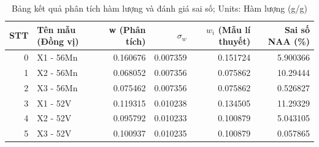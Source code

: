 \begin{table}[htbp]
    \centering
    \caption{Bảng kết quả phân tích hàm lượng và đánh giá sai số; Units: Hàm lượng (g/g)}
      \begin{tabular}{rlrrrr}
    STT & Tên mẫu (Đồng vị) & w (Phân tích) & $\sigma_w$ & $w_{i}$ (Mẫu lí thuyết) & Sai số NAA (\%) \\
    \hline    
    0     & X1 - 56Mn  & 0.160676 & 0.007359 & 0.151724 & 5.900366 \\
    1     & X2 - 56Mn  & 0.068052 & 0.007356 & 0.075862 & 10.29444 \\
    2     & X3 - 56Mn  & 0.075462 & 0.007356 & 0.075862 & 0.526827 \\\hline
    3     & X1 - 52V   & 0.119315 & 0.010238 & 0.134505 & 11.29329 \\
    4     & X2 - 52V   & 0.095792 & 0.010233 & 0.100879 & 5.043105 \\
    5     & X3 - 52V   & 0.100937 & 0.010235 & 0.100879 & 0.057865 \\
    \hline
      \end{tabular}%
    \label{phantich_w}%
  \end{table}%
  
